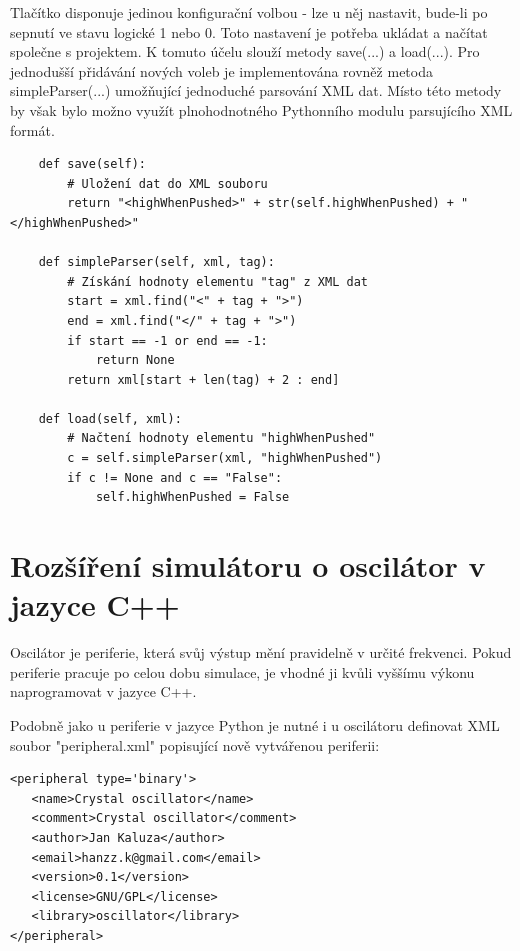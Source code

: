 Tlačítko disponuje jedinou konfigurační volbou - lze u něj nastavit, bude-li po sepnutí ve stavu logické 1 nebo 0. Toto nastavení je potřeba ukládat a načítat společne s projektem. K tomuto účelu slouží metody save(...) a load(...). Pro jednodušší přidávání nových voleb je implementována rovněž metoda simpleParser(...) umožňující jednoduché parsování XML dat. Místo této metody by však bylo možno využít plnohodnotného Pythonního modulu parsujícího XML formát.
\begin{lstlisting}
	def save(self):
		# Uložení dat do XML souboru
		return "<highWhenPushed>" + str(self.highWhenPushed) + "</highWhenPushed>"

	def simpleParser(self, xml, tag):
		# Získání hodnoty elementu "tag" z XML dat
		start = xml.find("<" + tag + ">")
		end = xml.find("</" + tag + ">")
		if start == -1 or end == -1:
			return None
		return xml[start + len(tag) + 2 : end]

	def load(self, xml):
		# Načtení hodnoty elementu "highWhenPushed"
		c = self.simpleParser(xml, "highWhenPushed")
		if c != None and c == "False":
			self.highWhenPushed = False
\end{lstlisting}

\section{Rozšíření simulátoru o oscilátor v jazyce C++}
\label{oscilator}

Oscilátor je periferie, která svůj výstup mění pravidelně v určité frekvenci. Pokud periferie pracuje po celou dobu simulace, je vhodné ji kvůli vyššímu výkonu naprogramovat v jazyce C++.

Podobně jako u periferie v jazyce Python je nutné i u oscilátoru definovat XML soubor "peripheral.xml" popisující nově vytvářenou periferii:

\lstset{language=XML, numbers=left, frame=single, breaklines=true, tabsize=2, xleftmargin=20pt}
\begin{lstlisting}
<peripheral type='binary'>
   <name>Crystal oscillator</name>
   <comment>Crystal oscillator</comment>
   <author>Jan Kaluza</author>
   <email>hanzz.k@gmail.com</email>
   <version>0.1</version>
   <license>GNU/GPL</license>
   <library>oscillator</library>
</peripheral>
\end{lstlisting}

